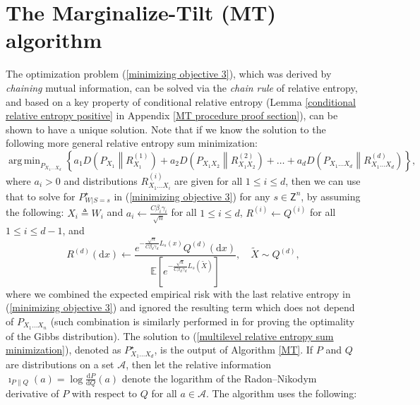 \documentclass{article}
\DeclareMathOperator*{\argmin}{arg\,min}
\newcommand{\E}{\mathbb{E}}
\newcommand{\Z}[0]{\mathsf{Z}}
\begin{document}
\section{The Marginalize-Tilt (MT) algorithm}\label{MT section}
The optimization problem (\ref{minimizing objective 3}), which was derived by \emph{chaining} mutual information, can be solved via the \emph{chain rule} of relative entropy, and based on a key property of conditional relative entropy (Lemma \ref{conditional relative entropy positive} in Appendix \ref{MT procedure proof section}), can be shown to have a unique solution.
Note that
if we know the solution to the following more general relative entropy sum minimization:
\begin{equation}\label{multilevel relative entropy sum minimization}
	\argmin_{P_{X_1\dots X_d}} \left\{a_1D\left(P_{X_1}\middle\|R^{(1)}_{X_1}\right)+a_2D\left(P_{X_1X_2}\middle\|R^{(2)}_{X_1X_2}\right)+\dots+a_dD\left(P_{X_1\dots X_d}\middle\|R^{(d)}_{X_1\dots X_d}\right)\right\},
\end{equation}
where $a_i>0$ and distributions $R^{(i)}_{X_1\dots X_i}$ are given for all $1\leq i \leq d$, then we can use that to solve for $P^{\star}_{W|S=s}$ in (\ref{minimizing objective 3}) for any $s\in \Z^n$, by assuming the following: $X_i\triangleq W_i$ and 
$a_i \gets \frac{C\beta_i\gamma_i}{\sqrt{n}} $ for all $1\leq i\leq d$, $R^{(i)}\gets Q^{(i)}$ for all $1\leq i\leq d-1$, and
\begin{equation}\nonumber
	R^{(d)}(\mathrm{d}x)\gets \frac{e^{-\frac{\sqrt{n}}{C\beta_d\gamma_d} L_{s}(x)}Q^{(d)}(\mathrm{d}x) }{\E\left[e^{-\frac{\sqrt{n}}{C\beta_d\gamma_d} L_{s}(\widetilde{X})}\right]},\quad \widetilde{X}\sim Q^{(d)},
\end{equation} 
where we combined the expected empirical risk with the last relative entropy in (\ref{minimizing objective 3}) and ignored the resulting term which does not depend of $P_{X_1\dots X_n}$ (such combination is similarly performed in \cite[Section IV]{zhang2006information} for proving the optimality of the Gibbs distribution).
The solution to (\ref{multilevel relative entropy sum minimization}), denoted as $P^{\star}_{X_1\dots X_d}$, is the output of Algorithm \ref{MT}. If $P$ and $Q$ are distributions on a set $\mathcal{A}$, then let the relative information $\nonumber
	\imath_{P\|Q}(a)=\log \frac{\mathrm{d}P}{\mathrm{d}Q}(a)
$ denote the logarithm of the Radon--Nikodym derivative of $P$ with respect to $Q$ for all $a\in \mathcal{A}$.  The algorithm uses the following:
\end{document}
